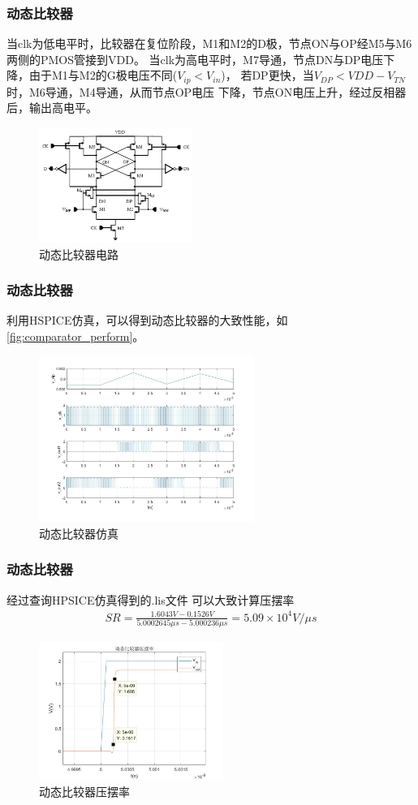 \documentclass[10pt, mathserif]{beamer}	%
\newcommand{\ftitle}[1]{\frametitle{#1}}	%
\begin{document}
	\begin{frame}
		\ftitle{动态比较器}
		\par 当clk为低电平时，比较器在复位阶段，M1和M2的D极，节点ON与OP经M5与M6两侧的PMOS管接到VDD。
		当clk为高电平时，M7导通，节点DN与DP电压下降，由于M1与M2的G极电压不同($ V_{ip} < V_{in} $)，
		若DP更快，当$ V_{DP} < VDD - V_{TN} $时，M6导通，M4导通，从而节点OP电压
		下降，节点ON电压上升，经过反相器后，输出高电平。
		\begin{figure}[H]
			\centering
			\includegraphics[width=5cm]{comparator}
			\caption{\label{fig:comparator}动态比较器电路}
		\end{figure}
	\end{frame}

	\begin{frame}
		\ftitle{动态比较器}
		\par 利用HSPICE仿真，可以得到动态比较器的大致性能，如\autoref{fig:comparator_perform}。
		\begin{figure}[H]
			\centering
			\includegraphics[width=7cm]{comparator_perform}
			\caption{\label{fig:comparator_perform}动态比较器仿真}
		\end{figure}
	\end{frame}

	\begin{frame}
		\ftitle{动态比较器}
		\par 经过查询HPSICE仿真得到的.lis文件
		可以大致计算压摆率
		\begin{align}
			SR = \frac{1.6043V-0.1526V}{5.0002645\mu s-5.000236\mu s} = 5.09\times10^{4}V/\mu s
		\end{align}
		\begin{figure}[H]
			\centering
			\includegraphics[width=6cm]{comparator_SR}
			\caption{\label{fig:comparator_SR}动态比较器压摆率}
		\end{figure}
	\end{frame}
\end{document}
